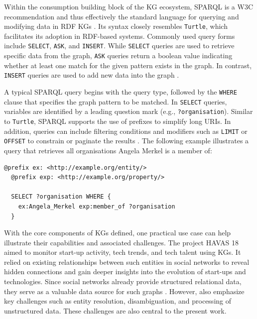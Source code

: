 \documentclass[a4paper,oneside,bibliography=totoc]{scrbook}
\begin{document}
Within the consumption building block of the \ac{KG} ecosystem, \ac{SPARQL} is a W3C recommendation and thus effectively the standard language for querying and modifying data in RDF \acp{KG} \cite{Prudhommeaux2008}. Its syntax closely resembles \texttt{Turtle}, which facilitates its adoption in RDF-based systems. Commonly used query forms include \texttt{SELECT}, \texttt{ASK}, and \texttt{INSERT}. While \texttt{SELECT} queries are used to retrieve specific data from the graph, \texttt{ASK} queries return a boolean value indicating whether at least one match for the given pattern exists in the graph. In contrast, \texttt{INSERT} queries are used to add new data into the graph \cite{VillazonTerrazas2017}.

A typical \ac{SPARQL} query begins with the query type, followed by the \texttt{WHERE} clause that specifies the graph pattern to be matched. In \texttt{SELECT} queries, variables are identified by a leading question mark (e.g., \texttt{?organisation}). Similar to \texttt{Turtle}, \ac{SPARQL} supports the use of prefixes to simplify long \acp{URI}. In addition, queries can include filtering conditions and modifiers such as \texttt{LIMIT} or \texttt{OFFSET} to constrain or paginate the results \cite{VillazonTerrazas2017}. The following example illustrates a query that retrieves all organisations Angela Merkel is a member of:

\begin{lstlisting}[language=SPARQL, caption=Example of a \ac{SPARQL} Query, label=lst:turtle_example]
  @prefix ex: <http://example.org/entity/>
  @prefix exp: <http://example.org/property/>
  
  SELECT ?organisation WHERE {
    ex:Angela_Merkel exp:member_of ?organisation
  }
\end{lstlisting}

With the core components of \acp{KG} defined, one practical use case can help illustrate their capabilities and associated challenges. The project HAVAS 18 aimed to monitor start-up activity, tech trends, and tech talent using \acp{KG}. It relied on existing relationships between such entities in social networks to reveal hidden connections and gain deeper insights into the evolution of start-ups and technologies. Since social networks already provide structured relational data, they serve as a valuable data source for such graphs \cite{Monti2017}. However, \citet{Monti2017} also emphasize key challenges such as entity resolution, disambiguation, and processing of unstructured data. These challenges are also central to the present work.
\end{document}
